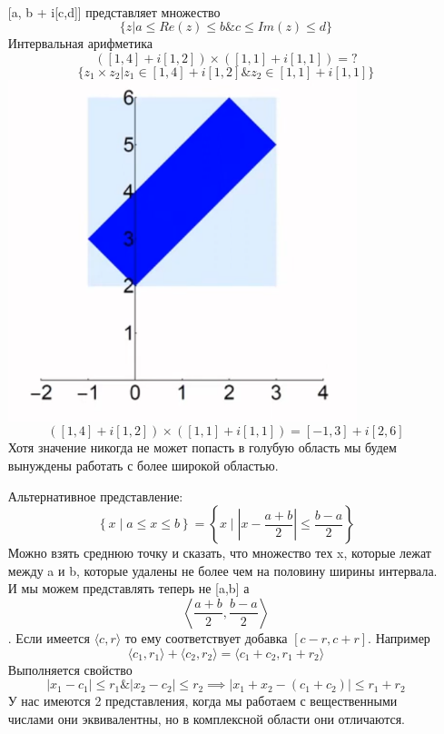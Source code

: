 \documentclass{article}
\begin{document}
\paragraph{}

\begin{itemize}
\item[] [a, b + i[c,d]] представляет множество \[\{z| a \leq Re(z) \leq b \& c \leq Im(z) \leq d \}\]
Интервальная арифметика
\[([1,4] + i[1,2]) \times ([1,1] + i[1,1]) = \text{?}\]
\[\{z_1 \times z_2 | z_1 \in [1,4] + i[1,2] \& z_2 \in [1,1] + i[1,1]\}\]
\includegraphics[width=0.8\textwidth, keepaspectratio]{./images/compl.png}
\[([1,4] + i[1,2]) \times ([1,1] + i[1,1]) = [-1,3] + i[2,6]\]
Хотя значение никогда не может попасть в голубую область мы будем вынуждены работать с более широкой областью.
\item[] Альтернативное представление:
\[
\left\{ x \mid a \leq x \leq b \right\} = \left\{ x \mid \left|x - \frac{a+b}{2}\right| \leq \frac{b-a}{2} \right\}
\]
Можно взять среднюю точку и сказать, что множество тех x, которые лежат между a и b, которые удалены не более чем на
половину ширины интервала. И мы можем представлять теперь не [a,b] а 
\[
\left\langle \frac{a+b}{2}, \frac{b-a}{2} \right\rangle
\].
Если имеется $\langle c, r \rangle$ то ему соответствует добавка $[c-r, c+r]$. Например
\[
\langle c_1, r_1 \rangle + \langle c_2, r_2 \rangle = \langle c_1 + c_2, r_1 + r_2 \rangle
\]
Выполняется свойство
\[
|x_1 - c_1| \leq r_1 \& |x_2-c_2| \leq r_2 \implies |x_1 + x_2 - (c_1 + c_2)| \leq r_1 + r_2
\]
У нас имеются 2 представления, когда мы работаем с вещественными числами они эквивалентны, но в комплексной области они отличаются.

\end{itemize}
\end{document}
